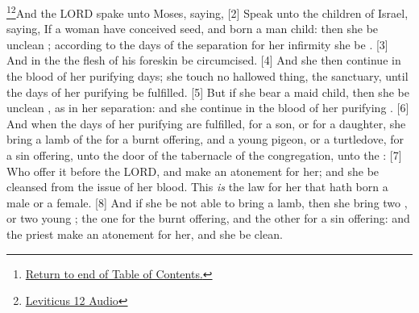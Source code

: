 \footnote{\textcolor[cmyk]{0.99998,1,0,0}{\hyperlink{TOC}{Return to end of Table of Contents.}}}\footnote{\href{https://audiobible.com/bible/leviticus_12.html}{\textcolor[cmyk]{0.99998,1,0,0}{Leviticus 12 Audio}}}\textcolor[cmyk]{0.99998,1,0,0}{And the LORD spake unto Moses, saying,}
[2] \textcolor[cmyk]{0.99998,1,0,0}{Speak unto the children of Israel, saying, If a woman have conceived seed, and born a man child: then she  be unclean ; according to the days of the separation for her infirmity  she be .}
[3] \textcolor[cmyk]{0.99998,1,0,0}{And in the  the flesh of his foreskin  be circumcised.}
[4] \textcolor[cmyk]{0.99998,1,0,0}{And she  then continue in the blood of her purifying  days; she  touch no hallowed thing,  the sanctuary, until the days of her purifying be fulfilled.}
[5] \textcolor[cmyk]{0.99998,1,0,0}{But if she bear a maid child, then she  be unclean , as in her separation: and she  continue in the blood of her purifying .}
[6] \textcolor[cmyk]{0.99998,1,0,0}{And when the days of her purifying are fulfilled, for a son, or for a daughter, she  bring a lamb of the  for a burnt offering, and a young pigeon, or a turtledove, for a sin offering, unto the door of the tabernacle of the congregation, unto the :}
[7] \textcolor[cmyk]{0.99998,1,0,0}{Who  offer it before the LORD, and make an atonement for her; and she  be cleansed from the issue of her blood. This \emph{is} the law for her that hath born a male or a female.}
[8] \textcolor[cmyk]{0.99998,1,0,0}{And if she be not able to bring a lamb, then she  bring two , or two young ; the one for the burnt offering, and the other for a sin offering: and the priest  make an atonement for her, and she  be clean.}
